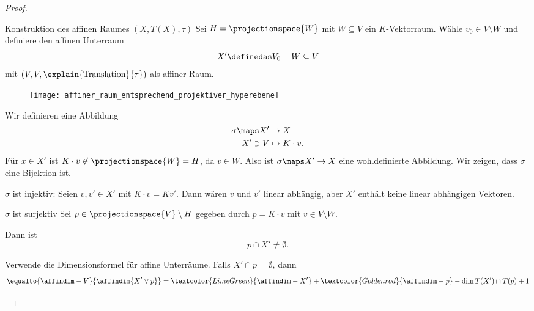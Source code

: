 \begin{proof}
  \begin{proofdescription}
    \item[Konstruktion des affinen Raumes \( (X,T(X),\tau) \)] Sei \( H=\projectionspace{W} \) mit \( W\subseteq V \) ein \( K \)-Vektorraum. Wähle \( v_0\in V\setminus W \) und definiere den affinen Unterraum
    \begin{equation*}
      X'\definedas V_0+W\subseteq V
    \end{equation*}
    mit \( (V,V,\explain{\text{Translation}}{\tau}) \) als affiner Raum.
    \begin{figure}[H]
      \centering
      \texttt{[image: affiner\_raum\_entsprechend\_projektiver\_hyperebene]}
      \label{fig:affiner_raum_entsprechend_projektiver_hyperebene}
    \end{figure}
    Wir definieren eine Abbildung
    \begin{equation*}
      \begin{split}
        \sigma\maps X'&\to X\\
      X'\ni V&\mapsto K\cdot v.
      \end{split}
    \end{equation*}
    Für \( x\in X' \) ist \( K\cdot v\not\in \projectionspace{W}=H \), da \( v\in W \). Also ist \( \sigma\maps X'\to X \) eine wohldefinierte Abbildung. Wir zeigen, dass \( \sigma \) eine Bijektion ist.
    \begin{proofdescription}
      \item[\( \sigma \) ist injektiv:] Seien \( v,v'\in X' \) mit \( K\cdot v=Kv' \). Dann wären \( v \) und \( v' \) linear abhängig, aber \( X' \) enthält keine linear abhängigen Vektoren.
      \item[\( \sigma \) ist surjektiv] Sei \( p\in \projectionspace{V}\setminus H \) gegeben durch \( p=K\cdot v \) mit \( v\in V\setminus W \). \begin{behauptung*}
        Dann ist 
        \begin{equation*}
          p\cap X'\neq \emptyset.
        \end{equation*}
      \end{behauptung*} 
      Verwende die Dimensionsformel für affine Unterräume. Falls \( X'\cap p=\emptyset \), dann
      \begin{align*}
        \equalto{\affindim-{V}}{\affindim{X'\vee p}}&=\textcolor{LimeGreen}{\affindim-{X'}}+\textcolor{Goldenrod}{\affindim-{p}}-\dim{T(X')\cap T(p)}+1\\

\end{align*}
\end{proofdescription}
\end{proofdescription}
\end{proof}
